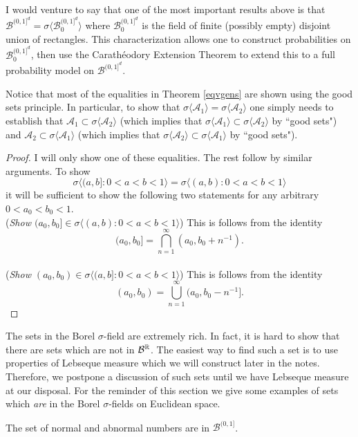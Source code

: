 I would venture to say that one of the most important results above is that $\mathcal B^{(0,1]^d} = \sigma\bigl\langle  \mathcal B_0^{(0,1]^d}  \bigr\rangle$ where $\mathcal B_0^{(0,1]^d}$ is the field of finite (possibly empty) disjoint union of rectangles. This characterization allows one to construct probabilities on $\mathcal B_0^{(0,1]^d}$, then use the Carath\'eodory Extension Theorem to extend this to a full probability model on $\mathcal B^{(0,1]^d}$.

Notice that most of the equalities in Theorem \ref{eqvgens} are shown using the good sets principle. In particular, to show that $\sigma\langle \mathcal A_1\rangle=\sigma\langle\mathcal A_2 \rangle$ one simply needs to establish that $ \mathcal A_1 \subset \sigma\langle \mathcal A_2\rangle$ (which implies that $ \sigma\langle \mathcal A_1\rangle \subset \sigma\langle \mathcal A_2\rangle$ by ``good sets") and $ \mathcal A_2 \subset \sigma\langle \mathcal A_1\rangle$ (which implies that $ \sigma\langle \mathcal A_2\rangle \subset \sigma\langle \mathcal A_1\rangle$ by ``good sets").

\begin{proof}
I will only show one of these equalities. The rest follow by similar arguments.
To show
\[ \sigma\bigl\langle (a,b]: 0< a < b < 1 \bigr\rangle =\sigma\bigl\langle (a,b): 0< a < b <1  \bigr\rangle\]
it will be sufficient to show the following two statements for any arbitrary $0<a_0<b_0<1$.
\\
\textbullet({\sl Show $(a_0,b_0]\in \sigma\langle (a,b):0<a<b<1\rangle$})
This is follows from the identity
\[(a_0,b_0] = \bigcap_{n=1}^\infty (a_0,b_0+n^{-1} ).  \]
\\
\textbullet({\sl Show $(a_0,b_0)\in \sigma\langle (a,b]:0<a<b<1\rangle$})
This is follows from the identity
\[(a_0,b_0) = \bigcup_{n=1}^\infty (a_0,b_0-n^{-1}  ].  \]
\end{proof}

The sets in the Borel $\sigma$-field are extremely rich. In fact, it is hard to show that there are sets which are not in $\mathcal B^{\Bbb R}$. The easiest way to find such a set is to use properties of Lebseque measure which we will construct later in the notes. Therefore, we postpone a discussion of such sets until	 we have Lebseque measure at our disposal. For the reminder of this section we give some examples of sets which {\em are} in the Borel $\sigma$-fields on Euclidean space.

\begin{example}
The set of normal and abnormal numbers are in $\mathcal B^{(0,1]}$.
\end{example}


